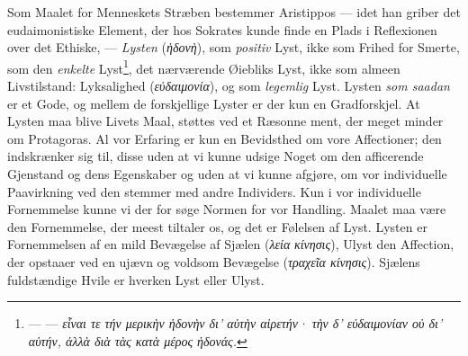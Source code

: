 \documentclass[12pt,a4paper]{book}
\newcommand{\gk}[1]{\textit{#1}}
\begin{document}
Som Maalet for Menneskets Stræben bestemmer Aristippos
--- idet han griber det eudaimonistiske Element, der hos Sokrates
kunde finde en Plads i Reflexionen over det Ethiske, ---
\emph{Lysten} (\gk{ἡδονὴ}), som \emph{positiv} Lyst, ikke som Frihed for
Smerte, som den \emph{enkelte} Lyst\footnote{--- --- \gk{εἶναι τε τήν μερικὴν ἡδονὴν δι' αὑτὴν αἱρετήν· τὴν δ' εὐδαιμονίαν οὐ δι' αὑτήν, ἀλλὰ διὰ τὰς κατὰ μέρος ἡδονάς.}}, det nærværende Øiebliks
Lyst, ikke som almeen Livstilstand: Lyksalighed (\gk{εὐδαιμονία}),
og som \emph{legemlig} Lyst. Lysten \emph{som saadan} er et Gode,
og mellem de forskjellige Lyster er der kun en Gradforskjel.
At Lysten maa blive Livets Maal, støttes ved et Ræsonne\-%
ment, der meget minder om Protagoras. Al vor Erfaring
er kun en Bevidsthed om vore Affectioner; den indskrænker
sig til, disse uden at vi kunne udsige Noget om den afficerende
Gjenstand og dens Egenskaber og uden at vi kunne afgjøre,
om vor individuelle Paavirkning ved den stemmer med andre
Individers. Kun i vor individuelle Fornemmelse kunne vi der\-%
for søge Normen for vor Handling. Maalet maa være den
Fornemmelse, der meest tiltaler os, og det er Følelsen af Lyst.
Lysten er Fornemmelsen af en mild Bevægelse af Sjælen (\gk{λεία}
\gk{κίνησις}), Ulyst den Affection, der opstaaer ved en ujævn og
voldsom Bevægelse (\gk{τραχεῖα κίνησις}). Sjælens fuldstændige
Hvile er hverken Lyst eller Ulyst.
\end{document}
